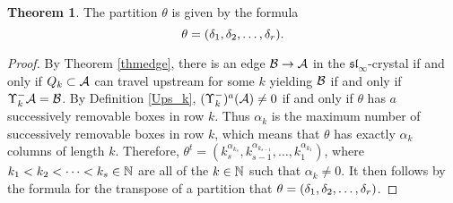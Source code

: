 \documentclass[12pt]{amsart}
\numberwithin{equation}{section}
\theoremstyle{definition}
\newtheorem{theorem}[equation]{Theorem}
\newcommand{\slinf}{\mathfrak{sl}_\infty}
\begin{document}
\begin{theorem}\label{thmdepth} The partition $\theta$ is given by the formula
$$\theta = (\delta_1,\delta_2,\dots,\delta_r).$$
\end{theorem}

\begin{proof}
By Theorem \ref{thmedge}, there is an edge $\mathcal{B}\rightarrow\mathcal{A}$ in the $\slinf$-crystal if and only if $Q_k\subset\mathcal{A}$ can travel upstream for some $k$ yielding $\mathcal{B}$ if and only if $\Upsilon_k^-\mathcal{A}=\mathcal{B} $.
By Definition \ref{Ups_k}, $(\Upsilon_k^-)^a(\mathcal{A})\neq0$ if and only if $\theta$ has $a$ successively removable boxes in row $k$. Thus $\alpha_k$ is the maximum number of successively removable boxes in row $k$, which means that $\theta$ has exactly $\alpha_k$ columns of length $k$. Therefore, 
$\theta^t=(k_s^{\alpha_{k_s}},k_{s-1}^{\alpha_{k_{s-1}}},\dots,k_1^{\alpha_{k_1}})$, where $k_1<k_2<\dots<k_s\in\mathbb{N}$ are all of the $k\in\mathbb{N}$ such that $\alpha_k\neq 0$. It then follows by the formula for the transpose of a partition that $\theta=(\delta_1,\delta_2,\dots,\delta_r)$.
\end{proof}
\end{document}
